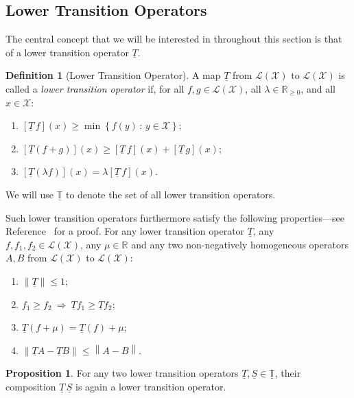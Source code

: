 \documentclass[10pt,a4paper]{paper}
\theoremstyle{definition}
\newtheorem{proposition}[theorem]{Proposition}
\newtheorem{definition}{Definition}
\newcommand{\reals}{\mathbb{R}}
\newcommand{\realsnonneg}{\reals_{\geq 0}}
\newcommand{\states}{\mathcal{X}}
\newcommand{\lt}{\underline{T}}
\newcommand{\gambles}{\mathcal{L}}
\newcommand{\gamblesX}{\gambles(\states)}
\newcommand{\then}{\Rightarrow}
\newcommand{\norm}[1]{\left\lVert #1 \right\rVert}
\begin{document}
\subsection{Lower Transition Operators}\label{subsec:lowertrans_rate}

The central concept that we will be interested in throughout this section is that of a lower transition operator $\lt$.

\begin{definition}[Lower Transition Operator]\label{def:coh_low_trans}
A map $\lt$ from $\gamblesX$ to $\gamblesX$ is called a \emph{lower transition operator} if, for all $f,g\in\gamblesX$, all $\lambda\in\realsnonneg$, and all $x\in\states$:
\begin{enumerate}[label=LT\arabic*:,ref=LT\arabic*]
\item
$\left[\lt\,f\right](x)\geq\min\left\{f(y)\,\colon\,y\in\states\right\}$; \label{LT:bounded_min}
\item
$\left[\lt(f+g)\right](x)\geq \left[\lt\,f\right](x)+\left[\lt\,g\right](x)$; \label{LT:super_additive}
\item
$\left[\lt(\lambda f)\right](x)=\lambda\left[\lt\,f\right](x)$. \label{LT:homo}
\end{enumerate}
\noindent We will use $\underline{\mathbb{T}}$ to denote the set of all lower transition operators.


Such lower transition operators furthermore satisfy the following properties---see Reference~\cite{DeBock:2016} for a proof. For any lower transition operator $\lt$, any $f,f_1,f_2\in\gamblesX$, any $\mu\in\reals$ and any two non-negatively homogeneous operators $A,B$ from $\gamblesX$ to $\gamblesX$:
\begin{enumerate}[label=LT\arabic*:,ref=LT\arabic*,start=4]
\item
$\norm{\lt} \leq 1$; \label{LT:norm_at_most_one}
\item
$f_1\geq f_2~\then~\lt f_1\geq\lt f_2$;\label{LT:monotonicity}
\item
$\lt(f+\mu)=\lt(f)+\mu$;\label{LT:constantadditivity}
\item
$\norm{\lt A - \lt B} \leq \norm{A - B}$. \label{LT:differencenorm}
\end{enumerate}
\vspace{0pt}
\end{definition}

\begin{proposition}\label{lemma:compositioncoherence}
For any two lower transition operators $\lt,\underline{S}\in\underline{\mathbb{T}}$, their composition $\lt\,\underline{S}$ is again a lower transition operator.%
\end{proposition}
\end{document}
